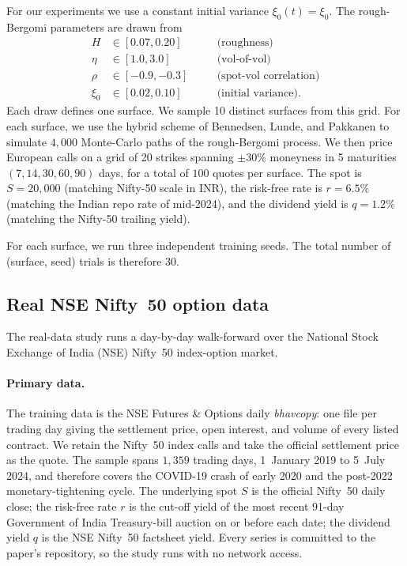 \documentclass[largeformat]{interact}
\theoremstyle{plain}
\theoremstyle{definition}
\begin{document}
For our experiments we use a constant initial variance $\xi_0(t) = \xi_0$. The rough-Bergomi parameters are drawn from
\begin{align*}
H &\in [0.07, 0.20] \quad &&\text{(roughness)} \\
\eta &\in [1.0, 3.0] \quad &&\text{(vol-of-vol)} \\
\rho &\in [-0.9, -0.3] \quad &&\text{(spot-vol correlation)} \\
\xi_0 &\in [0.02, 0.10] \quad &&\text{(initial variance)}.
\end{align*}
Each draw defines one surface. We sample 10 distinct surfaces from this grid. For each surface, we use the hybrid scheme of Bennedsen, Lunde, and Pakkanen \citeyearpar{bennedsen2017hybrid} to simulate $4{,}000$ Monte-Carlo paths of the rough-Bergomi process. We then price European calls on a grid of 20 strikes spanning $\pm 30\%$ moneyness in 5 maturities $(7, 14, 30, 60, 90)$ days, for a total of $100$ quotes per surface. The spot is $S = 20{,}000$ (matching Nifty-50 scale in INR), the risk-free rate is $r = 6.5\%$ (matching the Indian repo rate of mid-2024), and the dividend yield is $q = 1.2\%$ (matching the Nifty-50 trailing yield).

For each surface, we run three independent training seeds. The total number of (surface, seed) trials is therefore $30$.

\subsection{Real NSE Nifty~50 option data}
\label{sec:exp-real}

The real-data study runs a day-by-day walk-forward over the National Stock Exchange of India (NSE) Nifty~50 index-option market.

\paragraph{Primary data.}
The training data is the NSE Futures \& Options daily \emph{bhavcopy}: one file per trading day giving the settlement price, open interest, and volume of every listed contract. We retain the Nifty~50 index calls and take the official settlement price as the quote. The sample spans $1{,}359$ trading days, 1~January 2019 to 5~July 2024, and therefore covers the COVID-19 crash of early 2020 and the post-2022 monetary-tightening cycle. The underlying spot $S$ is the official Nifty~50 daily close; the risk-free rate $r$ is the cut-off yield of the most recent 91-day Government of India Treasury-bill auction on or before each date; the dividend yield $q$ is the NSE Nifty~50 factsheet yield. Every series is committed to the paper's repository, so the study runs with no network access.
\end{document}

